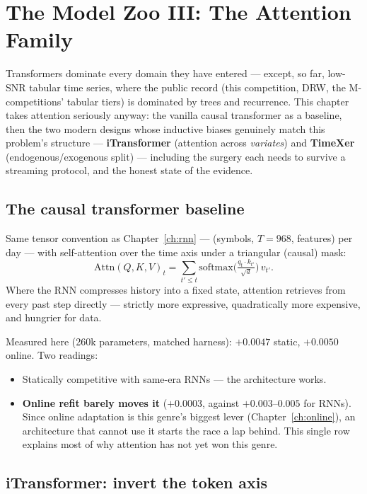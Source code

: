 \chapter{The Model Zoo III: The Attention Family}
\label{ch:attention}

Transformers dominate every domain they have entered --- except, so far,
low-SNR tabular time series, where the public record (this competition,
DRW, the M-competitions' tabular tiers) is dominated by trees and
recurrence. This chapter takes attention seriously anyway: the vanilla
causal transformer as a baseline, then the two modern designs whose
inductive biases genuinely match this problem's structure ---
\textbf{iTransformer} (attention across \emph{variates}) and
\textbf{TimeXer} (endogenous/exogenous split) --- including the surgery
each needs to survive a streaming protocol, and the honest state of the
evidence.

\section{The causal transformer baseline}

Same tensor convention as Chapter~\ref{ch:rnn} --- (symbols, $T{=}968$,
features) per day --- with self-attention over the time axis under a
triangular (causal) mask:
\[
\mathrm{Attn}(Q, K, V)_t = \sum_{t' \le t}
\mathrm{softmax}\!\Big(\tfrac{q_t \cdot k_{t'}}{\sqrt{d}}\Big)\, v_{t'} .
\]
Where the RNN compresses history into a fixed state, attention retrieves
from every past step directly --- strictly more expressive, quadratically
more expensive, and hungrier for data.

Measured here (260k parameters, matched harness): $+0.0047$ static,
$+0.0050$ online. Two readings:

\begin{itemize}
\item Statically competitive with same-era RNNs --- the architecture works.
\item \textbf{Online refit barely moves it} ($+0.0003$, against
  $+0.003$--$0.005$ for RNNs). Since online adaptation is this genre's
  biggest lever (Chapter~\ref{ch:online}), an architecture that cannot use
  it starts the race a lap behind. This single row explains most of why
  attention has not yet won this genre.
\end{itemize}

\section{iTransformer: invert the token axis}

